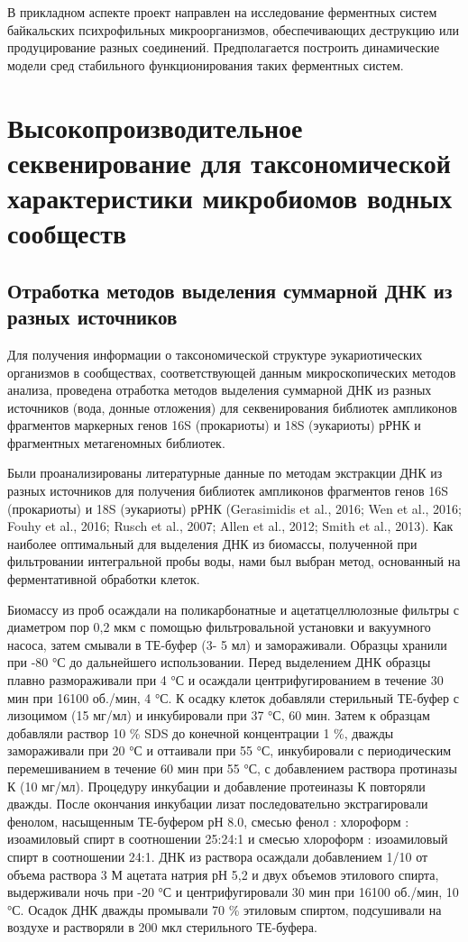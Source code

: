 \documentclass[a4paper,12pt,openany,final]{extreport}
\begin{document}
В прикладном аспекте проект направлен на исследование ферментных систем
байкальских психрофильных микроорганизмов, обеспечивающих деструкцию или
продуцирование разных соединений. Предполагается построить динамические
модели сред стабильного функционирования таких ферментных систем.

\chapter{Высокопроизводительное секвенирование для таксономической характеристики микробиомов водных сообществ}
\label{chap:1}

\section{Отработка методов выделения суммарной ДНК из разных источников}

Для получения информации о таксономической структуре эукариотических
организмов в сообществах, соответствующей данным микроскопических
методов анализа, проведена отработка методов выделения суммарной ДНК из
разных источников (вода, донные отложения) для секвенирования библиотек
ампликонов фрагментов маркерных генов 16S (прокариоты) и 18S (эукариоты)
рРНК и фрагментных метагеномных библиотек.

Были проанализированы литературные данные по методам экстракции ДНК из
разных источников для получения библиотек ампликонов фрагментов генов
16S (прокариоты) и 18S (эукариоты) рРНК (Gerasimidis et al., 2016; Wen
et al., 2016; Fouhy et al., 2016; Rusch et al., 2007; Allen et al.,
2012; Smith et al., 2013). Как наиболее оптимальный для выделения ДНК из
биомассы, полученной при фильтровании интегральной пробы воды, нами был
выбран метод, основанный на ферментативной обработки клеток.

Биомассу из проб осаждали на поликарбонатные и ацетатцеллюлозные фильтры
с диаметром пор 0,2 мкм с помощью фильтровальной установки и вакуумного
насоса, затем смывали в ТЕ-буфер (3- 5 мл) и замораживали. Образцы
хранили при -80 °С до дальнейшего использовании. Перед выделением ДНК
образцы плавно размораживали при 4 °С и осаждали центрифугированием в
течение 30 мин при 16100 об./мин, 4 °С. К осадку клеток добавляли
стерильный ТЕ-буфер с лизоцимом (15 мг/мл) и инкубировали при 37 °С, 60
мин. Затем к образцам добавляли раствор 10 \% SDS до конечной
концентрации 1 \%, дважды замораживали при 20 °С и оттаивали при 55 °С,
инкубировали с периодическим перемешиванием в течение 60 мин при 55 °С,
с добавлением раствора протиназы К (10 мг/мл). Процедуру инкубации и
добавление протеиназы К повторяли дважды. После окончания инкубации
лизат последовательно экстрагировали фенолом, насыщенным ТЕ-буфером рН
8.0, смесью фенол : хлороформ : изоамиловый спирт в соотношении 25:24:1
и смесью хлороформ : изоамиловый спирт в соотношении 24:1. ДНК из
раствора осаждали добавлением 1/10 от объема раствора 3 М ацетата натрия
рН 5,2 и двух объемов этилового спирта, выдерживали ночь при -20 °С и
центрифугировали 30 мин при 16100 об./мин, 10 °С. Осадок ДНК дважды
промывали 70 \% этиловым спиртом, подсушивали на воздухе и растворяли в
200 мкл стерильного ТЕ-буфера.
\end{document}
